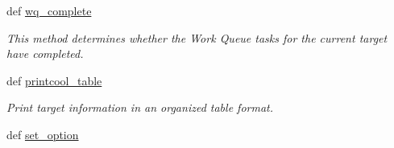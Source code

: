 \begin{DoxyCompactItemize}
def \hyperlink{classforcebalance_1_1target_1_1Target_af6099ec09486213869dba2491bd8ea04}{wq\-\_\-complete}
\begin{DoxyCompactList}\small\item\em \-This method determines whether the \-Work \-Queue tasks for the current target have completed. \end{DoxyCompactList}\item 
def \hyperlink{classforcebalance_1_1target_1_1Target_ac30a4e9d7d9fe06f7caefa5f7cfab09b}{printcool\-\_\-table}
\begin{DoxyCompactList}\small\item\em \-Print target information in an organized table format. \end{DoxyCompactList}\item 
def \hyperlink{classforcebalance_1_1BaseClass_a73e9a37a7632e79eb99f49bd15aced45}{set\-\_\-option}
\end{DoxyCompactItemize}
